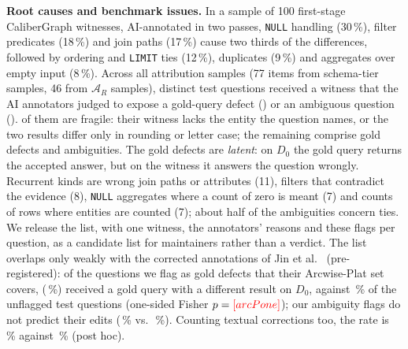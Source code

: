 \textbf{Root causes and benchmark issues.} In a sample of 100 first-stage CaliberGraph witnesses, AI-annotated in two passes, \texttt{NULL} handling (30\,\%), filter predicates (18\,\%) and join paths (17\,\%) cause two thirds of the differences, followed by ordering and \texttt{LIMIT} ties (12\,\%), duplicates (9\,\%) and aggregates over empty input (8\,\%). Across all attribution samples (77 items from schema-tier samples, 46 from $\mathcal A_R$ samples),  distinct test questions received a witness that the AI annotators judged to expose a gold-query defect () or an ambiguous question ().  of them are fragile: their witness lacks the entity the question names, or the two results differ only in rounding or letter case; the remaining  comprise  gold defects and  ambiguities. The gold defects are \emph{latent}: on $D_0$ the gold query returns the accepted answer, but on the witness it answers the question wrongly. Recurrent kinds are wrong join paths or attributes (11), filters that contradict the evidence (8), \texttt{NULL} aggregates where a count of zero is meant (7) and counts of rows where entities are counted (7); about half of the ambiguities concern ties. We release the list, with one witness, the annotators' reasons and these flags per question, as a candidate list for maintainers rather than a verdict. The list overlaps only weakly with the corrected annotations of Jin et al.~\cite{jin2026annotation} (pre-registered): of the  questions we flag as gold defects that their Arcwise-Plat set covers,  (\,\%) received a gold query with a different result on $D_0$, against \,\% of the  unflagged test questions (one-sided Fisher $p=\V{arcPone}$); our ambiguity flags do not predict their edits (\,\% vs.\ \,\%). Counting textual corrections too, the rate is \,\% against \,\% (post hoc).


